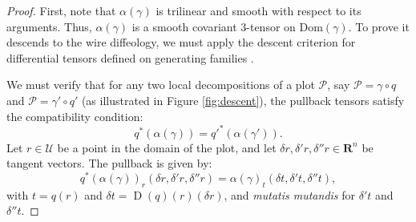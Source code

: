 \documentclass[10pt,letterpaper,reqno]{amsart}
\newcommand{\RR}{\mathbf{R}}
\newcommand{\Dom}{\mathrm{Dom}}
\newcommand{\cU}{\mathcal{U}}
\newcommand{\cP}{\mathcal{P}}
\DeclareMathOperator{\D}{D} %
\begin{document}
  \begin{proof}
    First,
    note that $\alpha(\gamma)$ is trilinear and smooth with respect to its arguments.
    Thus,
    $\alpha(\gamma)$ is a smooth covariant $3$-tensor on $\Dom(\gamma)$.
    To prove it descends to the wire diffeology,
    we must apply the descent criterion for differential tensors defined on generating families \cite[]{PIZ13}.
    
    We must verify that for any two local decompositions of a plot $\cP$,
    say $\cP = \gamma \circ q$ and $\cP = \gamma' \circ q'$ (as illustrated in Figure \ref{fig:descent}),
    the pullback tensors satisfy the compatibility condition:
    $$
      q^*(\alpha(\gamma)) = q'^*(\alpha(\gamma')).
      $$
    Let $r \in \cU$ be a point in the domain of the plot,
    and let $\delta r, \delta'r, \delta''r \in \RR^n$ be tangent vectors.
    The pullback is given by:
    $$
      q^*(\alpha(\gamma))_r(\delta r,\delta'r,\delta''r) =
      \alpha(\gamma)_{t}(\delta t,\delta't,\delta''t),
      $$
    with $t = q(r)$ and $\delta t = \D(q)(r)(\delta r)$,
    and \emph{mutatis mutandis} for $\delta't$ and $\delta''t$.
    

\end{proof}
\end{document}
